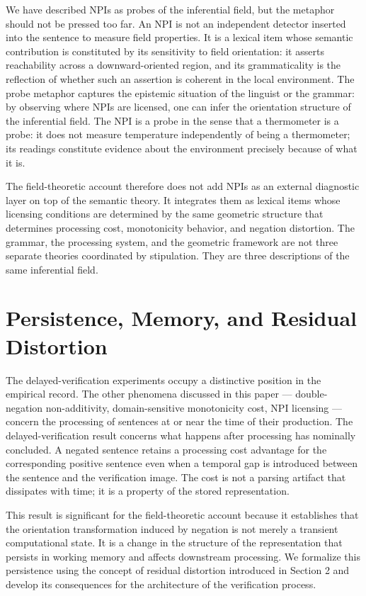 \documentclass[12pt]{article}
\theoremstyle{remark}
\begin{document}
We have described NPIs as probes of the inferential field, but the
metaphor should not be pressed too far. An NPI is not an independent
detector inserted into the sentence to measure field properties. It is a
lexical item whose semantic contribution is constituted by its
sensitivity to field orientation: it asserts reachability across a
downward-oriented region, and its grammaticality is the reflection of
whether such an assertion is coherent in the local environment. The probe
metaphor captures the epistemic situation of the linguist or the grammar:
by observing where NPIs are licensed, one can infer the orientation
structure of the inferential field. The NPI is a probe in the sense that
a thermometer is a probe: it does not measure temperature independently
of being a thermometer; its readings constitute evidence about the
environment precisely because of what it is.

The field-theoretic account therefore does not add NPIs as an external
diagnostic layer on top of the semantic theory. It integrates them as
lexical items whose licensing conditions are determined by the same
geometric structure that determines processing cost, monotonicity
behavior, and negation distortion. The grammar, the processing system,
and the geometric framework are not three separate theories coordinated
by stipulation. They are three descriptions of the same inferential field.

\section{Persistence, Memory, and Residual Distortion}

The delayed-verification experiments occupy a distinctive position in the
empirical record. The other phenomena discussed in this paper ---
double-negation non-additivity, domain-sensitive monotonicity cost, NPI
licensing --- concern the processing of sentences at or near the time of
their production. The delayed-verification result concerns what happens
after processing has nominally concluded. A negated sentence retains a
processing cost advantage for the corresponding positive sentence even
when a temporal gap is introduced between the sentence and the
verification image. The cost is not a parsing artifact that dissipates
with time; it is a property of the stored representation.

This result is significant for the field-theoretic account because it
establishes that the orientation transformation induced by negation is not
merely a transient computational state. It is a change in the structure
of the representation that persists in working memory and affects
downstream processing. We formalize this persistence using the concept of
residual distortion introduced in Section 2 and develop its consequences
for the architecture of the verification process.
\end{document}
